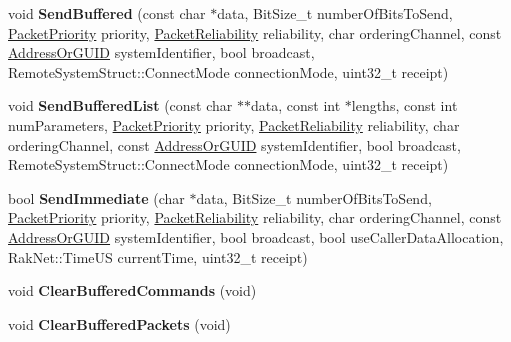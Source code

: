 \begin{DoxyCompactItemize}
\item 
\hypertarget{class_rak_net_1_1_rak_peer_a5bcd743ebe6b90061232b96c51c24006}{void {\bfseries Send\-Buffered} (const char $\ast$data, Bit\-Size\-\_\-t number\-Of\-Bits\-To\-Send, \hyperlink{_packet_priority_8h_a659378374e516180f93640c79f59705c}{Packet\-Priority} priority, \hyperlink{_packet_priority_8h_ae41fa01235e99dced384d137fa874a7e}{Packet\-Reliability} reliability, char ordering\-Channel, const \hyperlink{struct_rak_net_1_1_address_or_g_u_i_d}{Address\-Or\-G\-U\-I\-D} system\-Identifier, bool broadcast, Remote\-System\-Struct\-::\-Connect\-Mode connection\-Mode, uint32\-\_\-t receipt)}\label{class_rak_net_1_1_rak_peer_a5bcd743ebe6b90061232b96c51c24006}

\item 
\hypertarget{class_rak_net_1_1_rak_peer_a18417b29953f39049a77c3daa8403461}{void {\bfseries Send\-Buffered\-List} (const char $\ast$$\ast$data, const int $\ast$lengths, const int num\-Parameters, \hyperlink{_packet_priority_8h_a659378374e516180f93640c79f59705c}{Packet\-Priority} priority, \hyperlink{_packet_priority_8h_ae41fa01235e99dced384d137fa874a7e}{Packet\-Reliability} reliability, char ordering\-Channel, const \hyperlink{struct_rak_net_1_1_address_or_g_u_i_d}{Address\-Or\-G\-U\-I\-D} system\-Identifier, bool broadcast, Remote\-System\-Struct\-::\-Connect\-Mode connection\-Mode, uint32\-\_\-t receipt)}\label{class_rak_net_1_1_rak_peer_a18417b29953f39049a77c3daa8403461}

\item 
\hypertarget{class_rak_net_1_1_rak_peer_a7b78679b11fc1ebc643b123e3e008568}{bool {\bfseries Send\-Immediate} (char $\ast$data, Bit\-Size\-\_\-t number\-Of\-Bits\-To\-Send, \hyperlink{_packet_priority_8h_a659378374e516180f93640c79f59705c}{Packet\-Priority} priority, \hyperlink{_packet_priority_8h_ae41fa01235e99dced384d137fa874a7e}{Packet\-Reliability} reliability, char ordering\-Channel, const \hyperlink{struct_rak_net_1_1_address_or_g_u_i_d}{Address\-Or\-G\-U\-I\-D} system\-Identifier, bool broadcast, bool use\-Caller\-Data\-Allocation, Rak\-Net\-::\-Time\-U\-S current\-Time, uint32\-\_\-t receipt)}\label{class_rak_net_1_1_rak_peer_a7b78679b11fc1ebc643b123e3e008568}

\item 
\hypertarget{class_rak_net_1_1_rak_peer_acabb17a8d1ca4db7227f11484e7ef364}{void {\bfseries Clear\-Buffered\-Commands} (void)}\label{class_rak_net_1_1_rak_peer_acabb17a8d1ca4db7227f11484e7ef364}

\item 
\hypertarget{class_rak_net_1_1_rak_peer_a16be52efc88ca71238d82cb4c786499f}{void {\bfseries Clear\-Buffered\-Packets} (void)}\label{class_rak_net_1_1_rak_peer_a16be52efc88ca71238d82cb4c786499f}


\end{DoxyCompactItemize}
